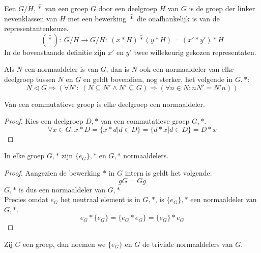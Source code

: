 \documentclass[main.tex]{subfiles}
\begin{document}
\begin{de}
  Een  $G/H,\bar{*}$ van een groep $G$ door een deelgroep $H$ van $G$ is de groep der linker nevenklassen van $H$ met een bewerking $\bar{*}$ die onafhankelijk is van de representantenkeuze.
  \[ (\bar{*}):\ G/H \rightarrow G/H:\ (x*H)\bar{*}(y*H) = (x' * y') * H \]
  In de bovenstaande definitie zijn $x'$ en $y'$ twee willekeurig gekozen representaten.
\end{de}

\begin{ei}
  \label{ei:normaaldelers-tussen-groep-en-deler}
  Als $N$ een normaaldeler is van $G$, dan is $N$ ook een normaaldeler van elke deelgroep tussen $N$ en $G$ en geldt bovendien, nog sterker, het volgende in $G,*$:
  \[ N \triangleleft G \Rightarrow (\forall N':\ (N \subseteq N' \wedge N' \subseteq G) \Rightarrow (\forall n\in N: nN' = N'n)) \]
\end{ei}

\begin{st}
  Van een commutatieve groep is elke deelgroep een normaaldeler.

  \begin{proof}
    Kies een deelgroep $D,*$ van een commutatieve groep $G,*$.
    \[ \forall x\in G: x*D = \{ x*d | d \in D \} = \{ d*x | d \in D \} = D*x \]
  \end{proof}
\end{st}

\begin{st}
  In elke groep $G,*$ zijn $\{e_{G}\},*$ en $G,*$ normaaldelers.
  
  \begin{proof}
    Aangezien de bewerking $*$ in $G$ intern is geldt het volgende:
    \[ gG = Gg \]
    $G,*$ is dus een normaaldeler van $G,*$\\
    Precies omdat $e_{G}$ het neutraal element is in $G,*$, is $\{e_{G}\},*$ een normaaldeler van $G,*$.
    \[ e_G*\{e_{G}\} = \{e_{G} * e_{G}\} = \{e_{G}\}*e_{G} \]
  \end{proof}
\end{st}

\begin{de}
  Zij $G$ een groep, dan noemen we $\{e_{G}\}$ en $G$ de triviale normaaldelers van $G$.
\end{de}
\end{document}
